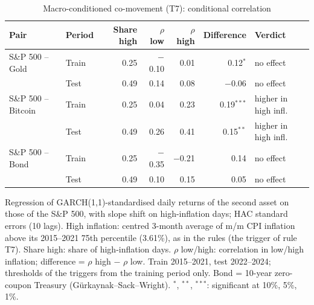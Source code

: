 \begin{table}[t]
\centering
\scriptsize
\setlength{\tabcolsep}{3.5pt}
\caption{Macro-conditioned co-movement (T7): conditional correlation}
\label{tab:econ_t7}
\begin{tabular}{llrrrrl}
\toprule
Pair & Period & Share high & $\rho$ low & $\rho$ high & Difference & Verdict \\
\midrule
S\&P 500 -- Gold & Train & 0.25 & $-$0.10 & 0.01 & 0.12$^{*}$ & no effect \\
 & Test & 0.49 & 0.14 & 0.08 & $-$0.06 & no effect \\
S\&P 500 -- Bitcoin & Train & 0.25 & 0.04 & 0.23 & 0.19$^{***}$ & higher in high infl. \\
 & Test & 0.49 & 0.26 & 0.41 & 0.15$^{**}$ & higher in high infl. \\
S\&P 500 -- Bond & Train & 0.25 & $-$0.35 & $-$0.21 & 0.14 & no effect \\
 & Test & 0.49 & 0.10 & 0.15 & 0.05 & no effect \\
\bottomrule
\end{tabular}
\par\smallskip
\parbox{\linewidth}{\footnotesize Regression of GARCH(1,1)-standardised daily returns of the second asset on those of the S\&P 500, with slope shift on high-inflation days; HAC standard errors (10 lags). High inflation: centred 3-month average of m/m CPI inflation above its 2015--2021 75th percentile (3.61\%), as in the rules (the trigger of rule T7). Share high: share of high-inflation days. $\rho$ low/high: correlation in low/high inflation; difference = $\rho$ high $-$ $\rho$ low. Train 2015--2021, test 2022--2024; thresholds of the triggers from the training period only. Bond = 10-year zero-coupon Treasury (G\"urkaynak--Sack--Wright). $^{*}$, $^{**}$, $^{***}$: significant at 10\%, 5\%, 1\%.}
\end{table}

